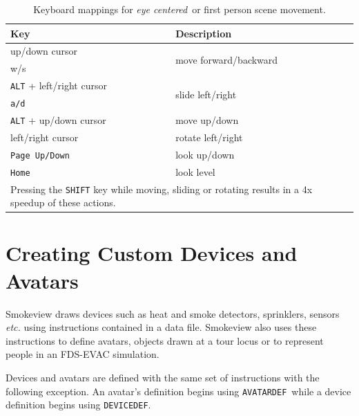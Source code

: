 \documentclass[11pt,twoside]{book}
\newcommand{\figoptions}{hbp}
\begin{document}
\begin{table}[\figoptions]
\begin{center}
\caption{Keyboard mappings for {\em eye centered}\ or first person scene movement.}
\vspace{0.1in}
\begin{tabular}{|l|l|}
\hline Key &   Description  \\

\hline\hline
up/down cursor & \multirow{2}{*}{move forward/backward}  \\
w/s &   \\\hline
{\tt ALT} + left/right cursor  & \multirow{2}{*}{slide left/right} \\
{\tt a/d}  &  \\ \hline
{\tt ALT} + up/down cursor  & move up/down  \\ \hline\hline
left/right cursor  & rotate left/right \\ \hline
{\tt Page Up/Down}  & look up/down \\ \hline
{\tt Home}  & look level \\ \hline\hline
\multicolumn{2}{|p{3.5in}|}{Pressing the {\tt SHIFT} key while moving, sliding or rotating
results in a  4x speedup of these actions. } \\ \hline

\end{tabular}
\label{tabKEYS}
\end{center}
\end{table}


\chapter{Creating Custom Devices and Avatars}
Smokeview draws devices such as heat and smoke detectors,
sprinklers, sensors {\em etc.} using instructions contained in a
data file.  Smokeview also uses these instructions to define avatars, objects drawn
at a tour locus or to represent people in an FDS-EVAC simulation.

Devices and avatars are defined with the same set of instructions with the following exception.
An avatar's definition begins using {\tt AVATARDEF}\ while a device definition
begins using {\tt DEVICEDEF}.
\end{document}
